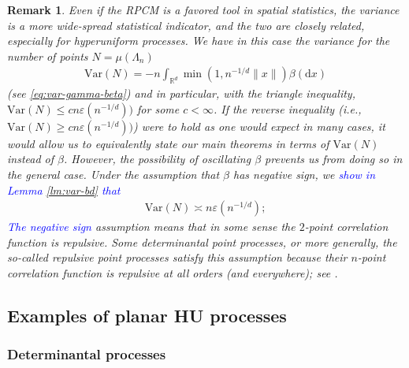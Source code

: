 \documentclass[12pt]{article}
\newtheorem{remark}{Remark}
\newcommand{\1}{\mathbf{1}}
\newcommand{\md}{\mathrm{d}}
\newcommand{\var}{\text{Var}}
\newcommand{\dy}[1]{\textcolor{blue}{#1}}
\newcommand{\dy}[1]{#1}%
\begin{document}
{{{{\begin{remark}
Even if the RPCM is a favored tool in spatial statistics, the variance is a more wide-spread statistical indicator, and the two are closely related, especially for hyperuniform processes. We have in this case {the variance for the number of points {$N = \mu(\Lambda_n)$}}
\begin{align*}
\var(N) = -n\int_{\mathbb{R}^{d}}\min( 1,n^{- 1/d}\|x\|)\beta (\md x)
\end{align*}
(see  \eqref{eq:var-gamma-beta}) and in particular, with the triangle inequality, $ \var(N)  \leqslant cn\varepsilon  (n^{- 1/d}))$ for some $ c<\infty $. If the reverse inequality {(i.e., $ \var(N)  \geqslant cn\varepsilon  (n^{- 1/d}))$)} were to hold as one would expect in many cases, it would allow us to equivalently state our main theorems in terms of $\var(N)$ instead of $\beta$. However, the possibility of oscillating $ \beta $ prevents us from doing so in the general case. Under the assumption that $ \beta $ has negative sign, we \dy{show in Lemma \ref{lm:var-bd} that}
\begin{align*} \textrm{Var}(N)\asymp n\varepsilon (n^{- 1/d});
\end{align*}
\dy{The negative sign} assumption means that in some sense the $ 2$-point correlation function is repulsive. Some determinantal point processes, or more generally, {the so-called {\it repulsive} point processes} satisfy this assumption because their $ n$-point correlation function is repulsive at all orders (and everywhere); {see \cite{blaszczyszyn2014clustering}}.
\end{remark}


\subsection{Examples of planar HU processes}
\label{sec:examples}

\subsubsection{Determinantal processes}

}}}}
\end{document}
